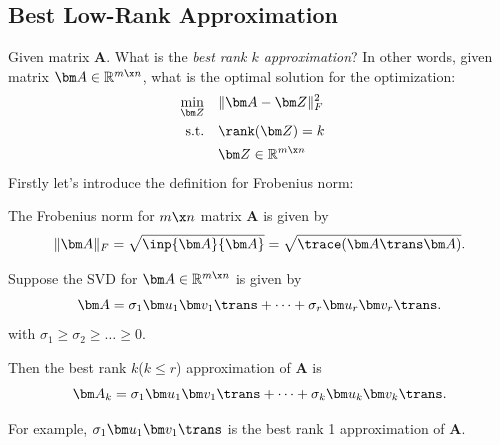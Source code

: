 \subsection{Best Low-Rank Approximation}
Given matrix $\bm A$. What is the \textit{best rank $k$ approximation}? In other words, given matrix $\bm A\in\mathbb{R}^{m\x n}$, what is the optimal solution for the optimization:
\begin{align*}
  \min_{\bm Z}\quad        & \|\bm A-\bm Z\|^2_{F} \\
  \text{s.t.\quad} &  \rank(\bm Z)=k &     \\
                   &\bm Z\in\mathbb{R}^{m\x n}
\end{align*}
Firstly let's introduce the definition for Frobenius norm:
\begin{definition}
The Frobenius norm for $m\x n$ matrix $\bm A$ is given by
\[
\|\bm A\|_{F}=\sqrt{\inp{\bm A}{\bm A}}=\sqrt{\trace(\bm A\trans\bm A)}.
\]
\end{definition}
\begin{theorem}\label{proposition_8.4}
Suppose the SVD for $\bm A\in\mathbb{R}^{m\x n}$ is given by
\[
\bm A=\sigma_1\bm u_1\bm v_1\trans+\dots+\sigma_r\bm u_r\bm v_r\trans.
\]
with $\sigma_1\ge\sigma_2\ge\dots\ge0$.

Then the best rank $k$($k\le r$) approximation of $\bm A$ is
\[
\bm A_k=\sigma_1\bm u_1\bm v_1\trans+\dots+\sigma_k\bm u_k\bm v_k\trans.
\]
\end{theorem}
For example, $\sigma_1\bm u_1\bm v_1\trans$ is the best rank 1 approximation of $\bm A$.
